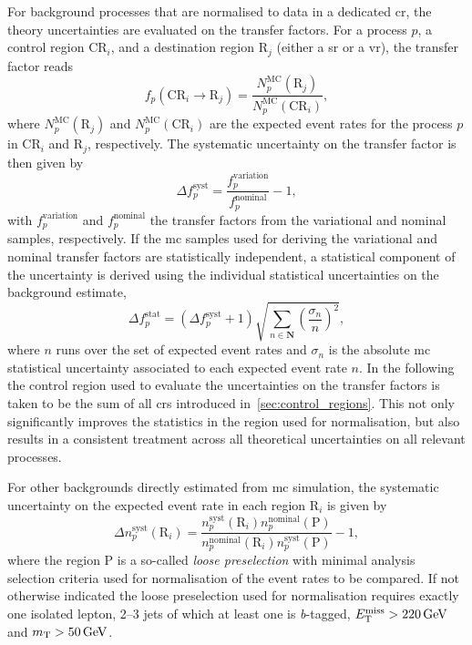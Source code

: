 For background processes that are normalised to data in a dedicated \gls{cr}, the theory uncertainties are evaluated on the transfer factors. For a process $p$, a control region CR$_i$, and a destination region R$_j$ (either a \gls{sr} or a \gls{vr}), the transfer factor reads
\begin{equation}
	f_p(\mathrm{CR}_i\rightarrow \mathrm{R}_j) = \frac{N^\mathrm{MC}_p(\mathrm{R}_j)}{N^\mathrm{MC}_p(\mathrm{CR}_i)},
\end{equation}
where $N^\mathrm{MC}_p(\mathrm{R}_j)$ and $N^\mathrm{MC}_p(\mathrm{CR}_i)$ are the expected event rates for the process $p$ in CR$_i$ and R$_j$, respectively. The systematic uncertainty on the transfer factor is then given by
\begin{equation}
	\Delta f_p^\mathrm{syst} = \frac{f_p^\mathrm{variation}}{f_p^\mathrm{nominal}} - 1,
\end{equation}
with $f_p^\mathrm{variation}$ and $f_p^\mathrm{nominal}$ the transfer factors from the variational and nominal samples, respectively. If the \gls{mc} samples used for deriving the variational and nominal transfer factors are statistically independent, a statistical component of the uncertainty is derived using the individual statistical uncertainties on the background estimate,
\begin{equation}
	\Delta f_p^\mathrm{stat} = (\Delta f_p^\mathrm{syst} + 1 ) \sqrt{\sum_{n\in\boldsymbol{N}}(\frac{\sigma_n}{n})^2},
\end{equation}
 where $n$ runs over the set of expected event rates and $\sigma_n$ is the absolute \gls{mc} statistical uncertainty associated to each expected event rate $n$. In the following the control region used to evaluate the uncertainties on the transfer factors is taken to be the sum of all \glspl{cr} introduced in~\cref{sec:control_regions}. This not only significantly improves the statistics in the region used for normalisation, but also results in a consistent treatment across all theoretical uncertainties on all relevant processes.
 
 For other backgrounds directly estimated from \gls{mc} simulation, the systematic uncertainty on the expected event rate in each region R$_i$ is given by
 \begin{equation}
 	\Delta n_p^\mathrm{syst}(\mathrm{R}_i) = \frac{n_p^\mathrm{syst}(\mathrm{R}_i)n_p^\mathrm{nominal}(\mathrm{P})}{n_p^\mathrm{nominal}(\mathrm{R}_i)n_p^\mathrm{syst}(\mathrm{P})} - 1,
 \end{equation}
 where the region P is a so-called \textit{loose preselection} with minimal analysis selection criteria used for normalisation of the event rates to be compared. If not otherwise indicated the loose preselection used for normalisation requires exactly one isolated lepton, 2--3 jets of which at least one is \textit{b}-tagged, $\etmiss>\SI{220}{\GeV}$ and $\mt>\SI{50}{\GeV}$.
 

